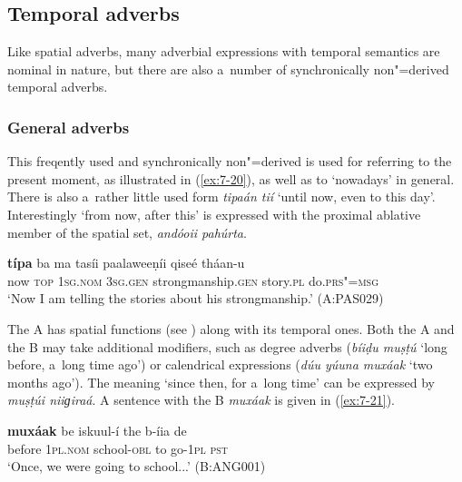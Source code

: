 \subsection{Temporal adverbs}
\label{subsec:7-1-3}

Like spatial adverbs, many adverbial expressions with temporal semantics are nominal in nature, but there are also a~number of synchronically non"=derived temporal adverbs.

\subsubsection*{General  adverbs}

 This freqently used and synchronically non"=derived  is
used for referring to the present moment, as illustrated in (\ref{ex:7-20}), as well as to
`nowadays' in general. There is also a~rather little used form \textit{tipaán tií} `until
now, even to this day'. Interestingly `from now, after this' is expressed with the proximal
ablative member of the spatial set, \textit{andóoii pahúrta}.

\begin{exe}
\ex
\label{ex:7-20}
\gll \textbf{típa} ba ma tasíi paalaweeṇíi qiseé tháan-u \\
now \textsc{top} \textsc{1sg.nom} \textsc{3sg.gen} strongmanship.\textsc{gen} story.\textsc{pl} do.\textsc{prs"=msg}\\
\glt `Now I am telling the stories about his strongmanship.' (A:PAS029)
\end{exe}

 The A  has spatial functions (see ) along with its temporal ones. Both the A and the B  may take additional modifiers, such as degree adverbs (\textit{bíiḍu muṣṭú} `long before, a~long time ago') or calendrical expressions (\textit{dúu yúuna muxáak} `two months ago'). The meaning `since then, for a~long time' can be expressed by \textit{muṣṭúi niiɡiraá}. A sentence with the B  \textit{muxáak} is given in (\ref{ex:7-21}).

\begin{exe}
\ex
\label{ex:7-21}
\gll \textbf{muxáak} be iskuul-í the b-íia de \\
before  \textsc{1pl.nom} school-\textsc{obl} to go-\textsc{1pl} \textsc{pst}\\
\glt `Once, we were going to school...' (B:ANG001)
\end{exe}

